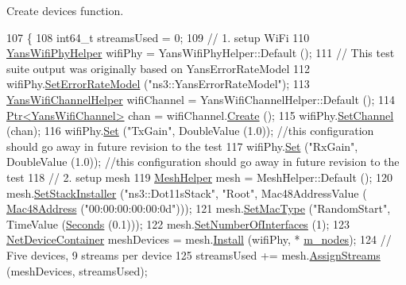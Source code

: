 Create devices function. 


\begin{DoxyCode}
107 \{
108   int64\_t streamsUsed = 0;
109   \textcolor{comment}{// 1. setup WiFi}
110   \hyperlink{classns3_1_1YansWifiPhyHelper}{YansWifiPhyHelper} wifiPhy = YansWifiPhyHelper::Default ();
111   \textcolor{comment}{// This test suite output was originally based on YansErrorRateModel}
112   wifiPhy.\hyperlink{classns3_1_1WifiPhyHelper_a219d3ae5881842aa42ea341b985ce114}{SetErrorRateModel} (\textcolor{stringliteral}{"ns3::YansErrorRateModel"});
113   \hyperlink{classns3_1_1YansWifiChannelHelper}{YansWifiChannelHelper} wifiChannel = YansWifiChannelHelper::Default ();
114   \hyperlink{classns3_1_1Ptr}{Ptr<YansWifiChannel>} chan = wifiChannel.\hyperlink{classns3_1_1YansWifiChannelHelper_a0532e292ab9452f3cf630c848708e563}{Create} ();
115   wifiPhy.\hyperlink{classns3_1_1YansWifiPhyHelper_ad2e9a27587dd4ff320435c93cc2676de}{SetChannel} (chan);
116   wifiPhy.\hyperlink{classns3_1_1WifiPhyHelper_a2527d6d7b29f717fd7436166c5f05f1a}{Set} (\textcolor{stringliteral}{"TxGain"}, DoubleValue (1.0)); \textcolor{comment}{//this configuration should go away in future revision to
       the test}
117   wifiPhy.\hyperlink{classns3_1_1WifiPhyHelper_a2527d6d7b29f717fd7436166c5f05f1a}{Set} (\textcolor{stringliteral}{"RxGain"}, DoubleValue (1.0)); \textcolor{comment}{//this configuration should go away in future revision to
       the test}
118   \textcolor{comment}{// 2. setup mesh}
119   \hyperlink{classns3_1_1MeshHelper}{MeshHelper} mesh = MeshHelper::Default ();
120   mesh.\hyperlink{classns3_1_1MeshHelper_ac1074aff829d0cde1659bdef572880ca}{SetStackInstaller} (\textcolor{stringliteral}{"ns3::Dot11sStack"}, \textcolor{stringliteral}{"Root"}, Mac48AddressValue (
      \hyperlink{classns3_1_1Mac48Address}{Mac48Address} (\textcolor{stringliteral}{"00:00:00:00:00:0d"})));
121   mesh.\hyperlink{classns3_1_1MeshHelper_a549d568927a88e95a721f2be58232c10}{SetMacType} (\textcolor{stringliteral}{"RandomStart"}, TimeValue (\hyperlink{group__timecivil_ga33c34b816f8ff6628e33d5c8e9713b9e}{Seconds} (0.1)));
122   mesh.\hyperlink{classns3_1_1MeshHelper_adfc08b62a8d6e835d0fbbac7a349ef5f}{SetNumberOfInterfaces} (1);
123   \hyperlink{classns3_1_1NetDeviceContainer}{NetDeviceContainer} meshDevices = mesh.\hyperlink{classns3_1_1MeshHelper_a7b33f6ca7b6842b3def4479bc7526f2c}{Install} (wifiPhy, *
      \hyperlink{classHwmpProactiveRegressionTest_a523e4ee084993a1e8c192aef539cc119}{m\_nodes});
124   \textcolor{comment}{// Five devices, 9 streams per device }
125   streamsUsed += mesh.\hyperlink{classns3_1_1MeshHelper_a93e9c88a375a86c621a494aafe68882e}{AssignStreams} (meshDevices, streamsUsed);

\end{DoxyCode}
